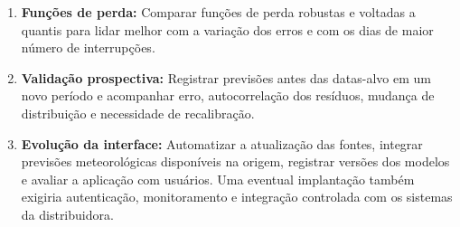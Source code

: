 \begin{enumerate}
    \item \textbf{Funções de perda:} Comparar funções de perda robustas e voltadas a quantis para lidar melhor com a variação dos erros e com os dias de maior número de interrupções.

    \item \textbf{Validação prospectiva:} Registrar previsões antes das datas-alvo em um novo período e acompanhar erro, autocorrelação dos resíduos, mudança de distribuição e necessidade de recalibração.

    \item \textbf{Evolução da interface:} Automatizar a atualização das fontes, integrar previsões meteorológicas disponíveis na origem, registrar versões dos modelos e avaliar a aplicação com usuários. Uma eventual implantação também exigiria autenticação, monitoramento e integração controlada com os sistemas da distribuidora.
\end{enumerate}
